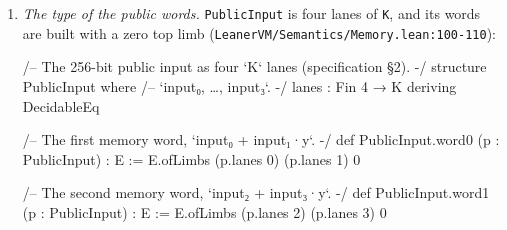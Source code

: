 \begin{enumerate}
\item \emph{The type of the public words.} \texttt{PublicInput} is four lanes of \texttt{K}, and its words are built with a zero top limb (\texttt{L\allowbreak{}e\allowbreak{}a\allowbreak{}n\allowbreak{}e\allowbreak{}r\allowbreak{}V\allowbreak{}M\allowbreak{}/\allowbreak{}S\allowbreak{}e\allowbreak{}m\allowbreak{}a\allowbreak{}n\allowbreak{}t\allowbreak{}i\allowbreak{}c\allowbreak{}s\allowbreak{}/\allowbreak{}M\allowbreak{}e\allowbreak{}m\allowbreak{}o\allowbreak{}r\allowbreak{}y\allowbreak{}.\allowbreak{}l\allowbreak{}e\allowbreak{}a\allowbreak{}n\allowbreak{}:\allowbreak{}1\allowbreak{}0\allowbreak{}0\allowbreak{}-{}\allowbreak{}1\allowbreak{}1\allowbreak{}0}):

\begin{leancode}
/-- The 256-bit public input as four `K` lanes (specification §2). -/
structure PublicInput where
  /-- `input₀, …, input₃`. -/
  lanes : Fin 4 → K
  deriving DecidableEq

/-- The first memory word, `input₀ + input₁·y`. -/
def PublicInput.word0 (p : PublicInput) : E := E.ofLimbs (p.lanes 0) (p.lanes 1) 0

/-- The second memory word, `input₂ + input₃·y`. -/
def PublicInput.word1 (p : PublicInput) : E := E.ofLimbs (p.lanes 2) (p.lanes 3) 0
\end{leancode}


\end{enumerate}
